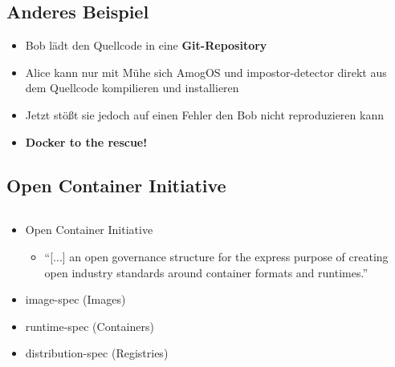 \subsection{Anderes Beispiel}\label{subsec:anderes-beispiel}
\begin{frame}
    \slidehead
    \vspace{-1em}
    \Large
    \begin{itemize}
        [<+->]
        \item Bob lädt den Quellcode in eine \textbf{Git-Repository}
        \item Alice kann nur mit Mühe sich AmogOS und impostor-detector direkt aus dem Quellcode kompilieren und installieren
        \item Jetzt stößt sie jedoch auf einen Fehler den Bob nicht reproduzieren kann
        \item \textbf{Docker to the rescue!}
    \end{itemize}
\end{frame}

\subsection{Open Container Initiative}\label{subsec:open-container-initiative}
\begin{frame}[c]
    \slidehead
    \Large
    \begin{columns}[c]
        \begin{column}{.5\textwidth}
            \begin{itemize}
                \item<1-> Open Container Initiative
                \begin{itemize}
                    \item \enquote{[...] an open governance structure for the express purpose of creating open industry standards around container formats and runtimes.}
                \end{itemize}
                \item<2-> image-spec (Images)
                \item<3-> runtime-spec (Containers)
                \item<4-> distribution-spec (Registries)
            \end{itemize}
        \end{column}
        \begin{column}{.5\textwidth}
            \centering
            
        \end{column}
    \end{columns}
\end{frame}

